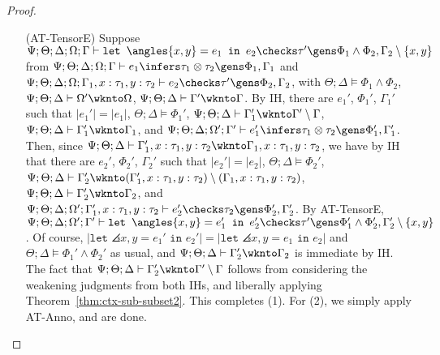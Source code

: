 \begin{proof}
\begin{itemize}
  \item[(AT-TensorE)]
  Suppose $\Psi ; \Theta ; \Delta ; \Omega ; \Gamma\vdash \texttt{let } \angles{x,y} = e_1 \texttt{ in } e_2 \checks \tau' \gens \Phi_1 \wedge \Phi_2, \Gamma_2 \setminus \{x,y\}$ from
  $\Psi ; \Theta ; \Delta ; \Omega ; \Gamma\vdash e_1 \infers \tau_1 \otimes \tau_2 \gens \Phi_1, \Gamma_1$ and
  $\Psi ; \Theta ; \Delta ; \Omega ; \Gamma_1,x : \tau_1, y : \tau_2\vdash e_2 \checks \tau' \gens \Phi_2,\Gamma_2$, with
  $\Theta ; \Delta \vDash \Phi_1 \wedge \Phi_2$,
  $\Psi ; \Theta ; \Delta \vdash \Omega' \wknto \Omega$,
  $\Psi ; \Theta ; \Delta \vdash \Gamma' \wknto \Gamma$.
  By IH, there are $e_1'$, $\Phi_1'$, $\Gamma_1'$ such that
  $|e_1'| = |e_1|$,
  $\Theta ; \Delta \vDash \Phi_1'$,
  $\Psi ; \Theta ; \Delta \vdash \Gamma_1' \wknto \Gamma' \setminus \Gamma$,
  $\Psi ; \Theta ; \Delta \vdash \Gamma_1' \wknto \Gamma_1$, and 
  $\Psi ; \Theta ; \Delta ; \Omega' ; \Gamma' \vdash e_1' \infers \tau_1 \otimes \tau_2 \gens \Phi_1', \Gamma_1'$.
  Then, since $\Psi ; \Theta ; \Delta \vdash \Gamma_1', x : \tau_1, y : \tau_2 \wknto \Gamma_1, x : \tau_1, y : \tau_2$,
  we have by IH that there are $e_2'$, $\Phi_2'$, $\Gamma_2'$ such that
  $|e_2'| = |e_2|$,
  $\Theta ; \Delta \vDash \Phi_2'$,
  $\Psi ; \Theta ; \Delta \vdash \Gamma_2' \wknto (\Gamma_1', x : \tau_1, y : \tau_2) \setminus (\Gamma_1, x : \tau_1, y : \tau_2)$,
  $\Psi ; \Theta ; \Delta \vdash \Gamma_2' \wknto \Gamma_2$, and
  $\Psi ; \Theta ; \Delta ; \Omega' ; \Gamma_1', x : \tau_1, y : \tau_2 \vdash e_2' \checks \tau_2 \gens \Phi_2',\Gamma_2'$.
  By AT-TensorE,
  $\Psi ; \Theta ; \Delta ; \Omega' ; \Gamma'\vdash \texttt{let } \angles{x,y} = e_1' \texttt{ in } e_2' \checks \tau' \gens \Phi_1' \wedge \Phi_2', \Gamma_2' \setminus \{x,y\}$.
  Of course, $|\texttt{let } \angles{x,y} = e_1' \texttt{ in } e_2'| = |\texttt{let } \angles{x,y} = e_1 \texttt{ in } e_2|$ and $\Theta ; \Delta \vDash \Phi_1' \wedge \Phi_2'$ as usual, and $\Psi ; \Theta ; \Delta \vdash \Gamma_2' \wknto \Gamma_2$ is immediate by IH. The fact that $\Psi ; \Theta ; \Delta \vdash \Gamma_2' \wknto \Gamma' \setminus \Gamma$ follows from considering the weakening judgments from both IHs, and liberally applying Theorem~\ref{thm:ctx-sub-subset2}. This completes (1). For (2), we simply apply AT-Anno, and are done.
  

\end{itemize}
\end{proof}
